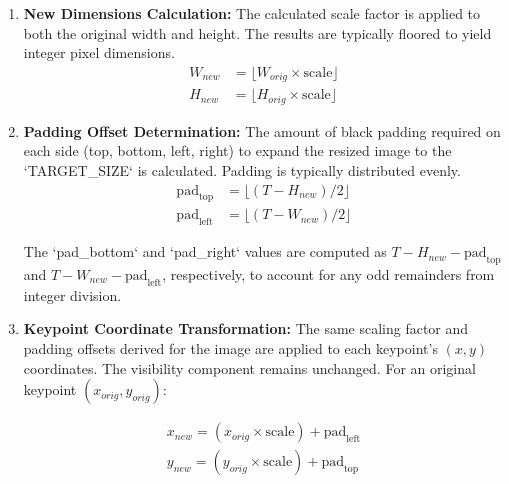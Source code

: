 \begin{enumerate}
	\item \textbf{New Dimensions Calculation:} The calculated scale factor is applied to both the original width and height.
	      The results are typically floored to yield integer pixel dimensions.
	      \begin{equation}
		      \label{eq:scale_dimensions}
		      \begin{aligned}
			      W_{new} & = \lfloor W_{orig} \times \text{scale} \rfloor \\
			      H_{new} & = \lfloor H_{orig} \times \text{scale} \rfloor
		      \end{aligned}
	      \end{equation}

	\item \textbf{Padding Offset Determination:} The amount of black padding required on each side
	      (top, bottom, left, right) to expand the resized image to the `TARGET\_SIZE` is calculated.
	      Padding is typically distributed evenly.
	      \begin{equation}
		      \label{eq:padding_offsets}
		      \begin{aligned}
			      \text{pad}_{\text{top}}  & = \lfloor (T - H_{new}) / 2 \rfloor \\
			      \text{pad}_{\text{left}} & = \lfloor (T - W_{new}) / 2 \rfloor
		      \end{aligned}
	      \end{equation}

	      The `pad\_bottom` and `pad\_right` values are computed as $T - H_{new} -
		      \text{pad}_{\text{top}}$ and $T - W_{new} - \text{pad}_{\text{left}}$,
	      respectively, to account for any odd remainders from integer division.

	\item \textbf{Keypoint Coordinate Transformation:} The same scaling factor
	      and padding offsets derived for the image are applied to each keypoint's
	      $(x, y)$ coordinates. The visibility component remains unchanged. For an
	      original keypoint $(x_{orig}, y_{orig})$:

	      \begin{equation}
		      \label{eq:scale_keypoints}
		      \begin{aligned}
			      x_{new} = (x_{orig} \times \text{scale}) + \text{pad}_{\text{left}} \\
			      y_{new} = (y_{orig} \times \text{scale}) + \text{pad}_{\text{top}}
		      \end{aligned}
	      \end{equation}
\end{enumerate}

